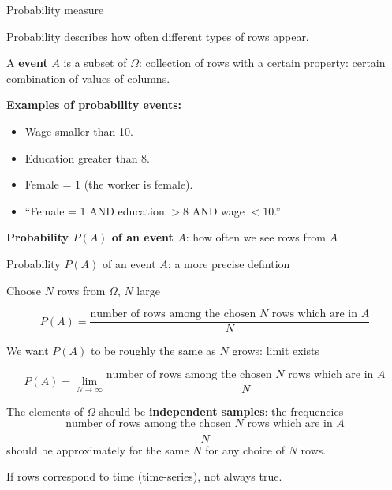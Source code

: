 \documentclass{beamer}
\begin{document}
\begin{frame}{Probability measure}




Probability describes how often different types of rows appear.

\medskip

A \textbf{event} $A$ is a subset of $\Omega$: collection of rows with a certain property: certain combination of values of columns. 

\textbf{Examples of probability events:}
\begin{itemize}
    \item Wage smaller than 10.
    \item Education greater than 8.
    \item Female = 1 (the worker is female).
    \item ``Female = 1 AND education $> 8$ AND wage $< 10$.''
\end{itemize}

\medskip

 \textbf{Probability $P(A)$ of an event $A$}: how often we see rows from $A$
 
\end{frame}
\begin{frame}{Probability $P(A)$ of an event $A$: a more precise defintion}

  Choose $N$ rows from $\Omega$, $N$ large

 \[ P(A)=\frac{\mbox{number of rows among the chosen $N$ rows which are in $A$}}{N} \]


  We want $P(A)$ to be roughly the same as $N$ grows: limit exists

 \[ P(A)=\lim_{N \rightarrow \infty} \frac{\mbox{number of rows among the chosen $N$ rows which are in $A$}}{N} \]


 \medskip

 The elements of $\Omega$ should be \textbf{independent samples}: the frequencies
  \[ \frac{\mbox{number of rows among the chosen $N$ rows which are in $A$}}{N} \]
  should be approximately for the same $N$ for any choice of $N$ rows.

  \medskip
   If rows correspond to time (time-series), not always true. 



\end{frame}
\end{document}
